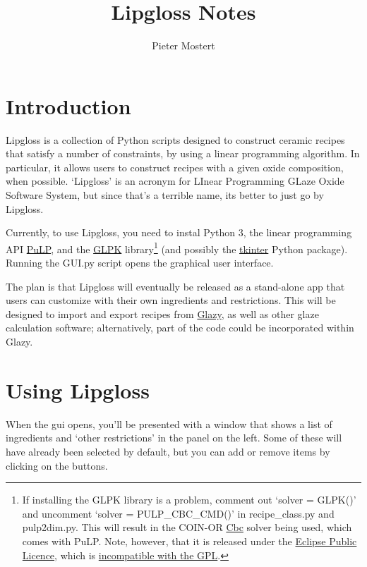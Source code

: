 \documentclass[a4paper,10pt]{article}
\title{Lipgloss Notes}
\author{Pieter Mostert}%
\def\'{\textquotesingle}
\begin{document}
\maketitle
\def\thefootnote{\fnsymbol{footnote}}\setcounter{footnote}{1}
\section{Introduction}
Lipgloss is a collection of Python scripts designed to construct ceramic recipes that satisfy a number of constraints, by using a linear programming algorithm. In particular, it allows users to construct recipes with a given oxide composition, when possible. `Lipgloss' is an acronym for LInear Programming GLaze Oxide Software System, but since that's a terrible name, it\'s better to just go by Lipgloss.

Currently, to use Lipgloss, you need to instal Python 3, the linear programming API \href{https://github.com/coin-or/pulp}{PuLP}, and the \href{https://www.gnu.org/software/glpk/}{GLPK} library\footnote{If installing the GLPK library is a problem, comment out `solver = GLPK()' and uncomment `solver = PULP\_CBC\_CMD()' in recipe\_class.py and pulp2dim.py. This will result in the COIN-OR \href{https://projects.coin-or.org/Cbc}{Cbc} solver being used, which comes with PuLP. Note, however, that it is released under the \href{https://en.wikipedia.org/wiki/Eclipse_Public_License}{Eclipse Public Licence}, which is \href{https://eclipse.org/legal/eplfaq.php}{incompatible with the GPL}.} (and possibly the \href{https://wiki.python.org/moin/TkInter}{tkinter} Python package). Running the GUI.py script opens the graphical user interface. 

The plan is that Lipgloss will eventually be released as a stand-alone app that users can customize with their own ingredients and restrictions. This will be designed to import and export recipes from \href{https://glazy.org}{Glazy}, as well as other glaze calculation software; alternatively, part of the code could be incorporated within Glazy.

\section{Using Lipgloss}

When the gui opens, you'll be presented with a window that shows a list of ingredients and `other restrictions' in the panel on the left. Some of these will have already been selected by default, but you can add or remove items by clicking on the buttons.
\end{document}
